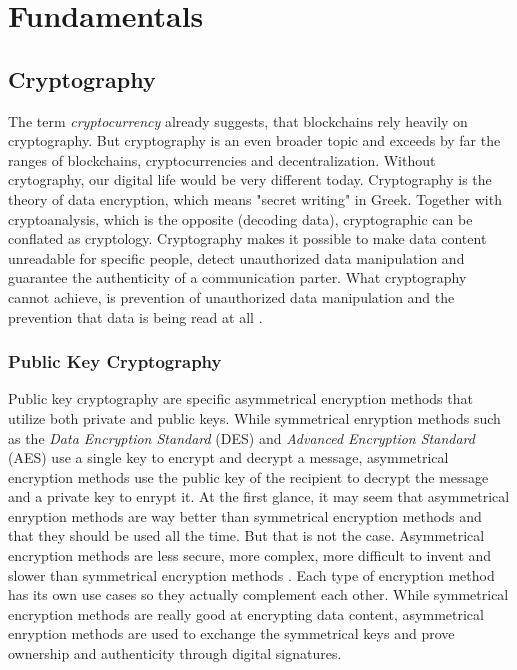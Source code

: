 \chapter{Fundamentals}
\label{cha:Fundamentals}

\section{Cryptography}

The term \textit{cryptocurrency} already suggests, that blockchains rely heavily on cryptography. But cryptography is an even broader topic and exceeds by far the ranges of blockchains, cryptocurrencies and decentralization. Without crytography, our digital life would be very different today. Cryptography is the theory of data encryption, which means "secret writing" in Greek. Together with cryptoanalysis, which is the opposite (decoding data), cryptographic can be conflated as cryptology. Cryptography makes it possible to make data content unreadable for specific people, detect unauthorized data manipulation and guarantee the authenticity of a communication parter. What cryptography cannot achieve, is prevention of unauthorized data manipulation and the prevention that data is being read at all \cite[pp. 10-11]{Schmeh2007}.

\subsection{Public Key Cryptography}
Public key cryptography are specific asymmetrical encryption methods that utilize both private and public keys. While symmetrical enryption methods such as the \textit{Data Encryption Standard} (DES) and \textit{Advanced Encryption Standard} (AES) use a single key to encrypt and decrypt a message, asymmetrical encryption methods use the public key of the recipient to decrypt the message and a private key to enrypt it. At the first glance, it may seem that asymmetrical enryption methods are way better than symmetrical encryption methods and that they should be used all the time. But that is not the case. Asymmetrical encryption methods are less secure, more complex, more difficult to invent and slower than symmetrical encryption methods \cite[p. 172]{Schmeh2007}. Each type of encryption method has its own use cases so they actually complement each other. While symmetrical encryption methods are really good at encrypting data content, asymmetrical enryption methods are used to exchange the symmetrical keys and prove ownership and authenticity through digital signatures.

